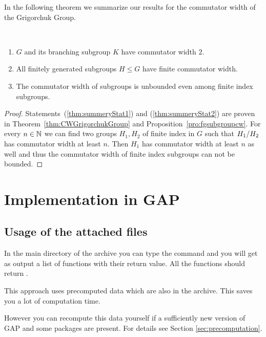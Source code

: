 \documentclass[a4paper,11pt]{amsart}
\begin{document}
In the following theorem we summarize our results for the commutator width of the Grigorchuk Group.
\begin{thm}\ 
 \begin{enumerate}
  \item $G$ and its branching subgroup $K$ have commutator width $2$. \label{thm:summeryStat1}
  \item All finitely generated subgroups $H\leq G$ have finite commutator width.\label{thm:summeryStat2}
  \item \label{thm:summeryStat3} The commutator width of subgroups is unbounded even among finite index subgroups.
 \end{enumerate}
\end{thm}
\begin{proof}
 Statements~(\ref{thm:summeryStat1}) and (\ref{thm:summeryStat2}) are proven in Theorem~\ref{thm:CWGrigorchukGroup} and Proposition~\ref{pro:fgsubgroupcw}.
 For every $n\in\mathbb{N}$ we can find two groups $H_1,H_2$ of finite index in $G$ such that ${H_1/H_2}$ has commutator
 width at least $n$. Then $H_1$ has commutator width at least $n$ as well and thus the commutator width of finite index subgroups can not be bounded.
\end{proof}
\section{Implementation in GAP}
\subsection{Usage of the attached files}
In the main directory of the archive you can type the command  and 
you will get as output a list of functions with their return value. All the functions should
return \gapinline{true}. 

This approach uses precomputed data which are also in the archive. This saves you a lot of
computation time.

However you can recompute this data yourself if a sufficiently new version of GAP and
some packages are present. For details see Section \ref{sec:precomputation}.
\end{document}
